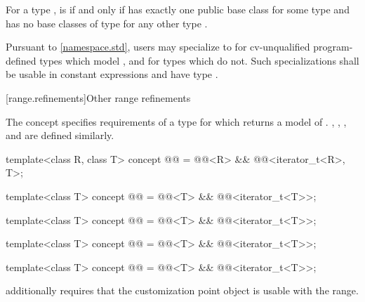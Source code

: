 \begin{itemdescr}
\pnum
For a type ,
 is 
if and only if
 has exactly one public base class 
for some type  and
 has no base classes of type 
for any other type .

\pnum
\remarks
Pursuant to \ref{namespace.std}, users may specialize 
to 
for cv-unqualified program-defined types which model ,
and  for types which do not.
Such specializations shall
be usable in constant expressions and
have type .
\end{itemdescr}

[range.refinements]{Other range refinements}

\pnum
The  concept specifies requirements of a
 type for which  returns
a model of .
, , ,
and  are defined similarly.

\begin{itemdecl}
template<class R, class T>
  concept @@ =
    @@<R> && @@<iterator_t<R>, T>;

template<class T>
  concept @@ =
    @@<T> && @@<iterator_t<T>>;

template<class T>
  concept @@ =
    @@<T> && @@<iterator_t<T>>;

template<class T>
  concept @@ =
    @@<T> && @@<iterator_t<T>>;

template<class T>
  concept @@ =
    @@<T> && @@<iterator_t<T>>;
\end{itemdecl}

\pnum
{} additionally requires that
the  customization point object
is usable with the range.


